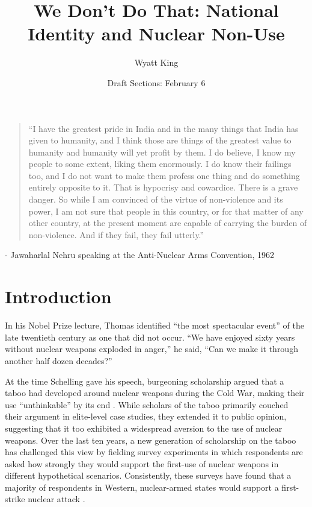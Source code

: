 \documentclass[12pt]{article}
\title{We Don't Do That: National Identity and Nuclear Non-Use}
\author{Wyatt King}
\date{Draft Sections: February 6}
\begin{document}
\maketitle

\blockquote{“I have the greatest pride in India and in the many things that India has given to humanity, and I think those are things of the greatest value to humanity and humanity will yet profit by them. I do believe, I know my people to some extent, liking them enormously. I do know their failings too, and I do not want to make them profess one thing and do something entirely opposite to it. That is hypocrisy and cowardice. There is a grave danger. So while I am convinced of the virtue of non-violence and its power, I am not sure that people in this country, or for that matter of any other country, at the present moment are capable of carrying the burden of non-violence. And if they fail, they fail utterly.” }

\begin{center}
    - Jawaharlal Nehru speaking at the Anti-Nuclear Arms Convention, 1962
\end{center}

\section{Introduction}
In his Nobel Prize lecture, Thomas \citet{schelling_astonishing_2006} identified “the most spectacular event” of the late twentieth century as one that did not occur. “We have enjoyed sixty years without nuclear weapons exploded in anger,” he said, “Can we make it through another half dozen decades?”

At the time Schelling gave his speech, burgeoning scholarship argued that a taboo had developed around nuclear weapons during the Cold War, making their use “unthinkable” by its end \citep{tannenwald_stigmatizing_2005}. While scholars of the taboo primarily couched their argument in elite-level case studies, they extended it to public opinion, suggesting that it too exhibited a widespread aversion to the use of nuclear weapons. Over the last ten years, a new generation of scholarship on the taboo has challenged this view by fielding survey experiments in which respondents are asked how strongly they would support the first-use of nuclear weapons in different hypothetical scenarios. Consistently, these surveys have found that a majority of respondents in Western, nuclear-armed states would support a first-strike nuclear attack \citep{sagan_revisiting_2017, haworth_what_2019,allison_under_2022, dill_kettles_2022}.
\end{document}
